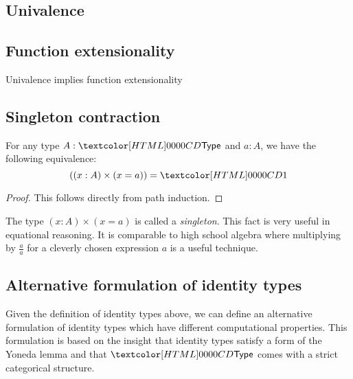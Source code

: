 \begin{definition}[Isomorphism]
  
\end{definition}

\begin{definition}[Equivalence]
  
\end{definition}



\subsection{Univalence}

\begin{definition}[Univalence]
  
\end{definition}

\subsection{Function extensionality}

\begin{lemma}
  Univalence implies function extensionality
\end{lemma}

\subsection{Singleton contraction}

\begin{proposition}
  For any type $A : \Type$ and $a : A$, we have the following
  equivalence:
  $$
  ((x : A) \times (x = a)) = \unitty
  $$
\end{proposition}

\begin{proof}
  This follows directly from path induction.
\end{proof}

The type $(x : A) \times (x = a)$ is called a \emph{singleton}. This
fact is very useful in equational reasoning. It is comparable to high
school algebra where multiplying by $\frac{a}{a}$ for a cleverly
chosen expression $a$ is a useful technique.

\subsection{Alternative formulation of identity types}

Given the definition of identity types above, we can define an
alternative formulation of identity types which have different
computational properties. This formulation is based on the insight
that identity types satisfy a form of the Yoneda lemma and that
$\Type$ comes with a strict categorical structure.

